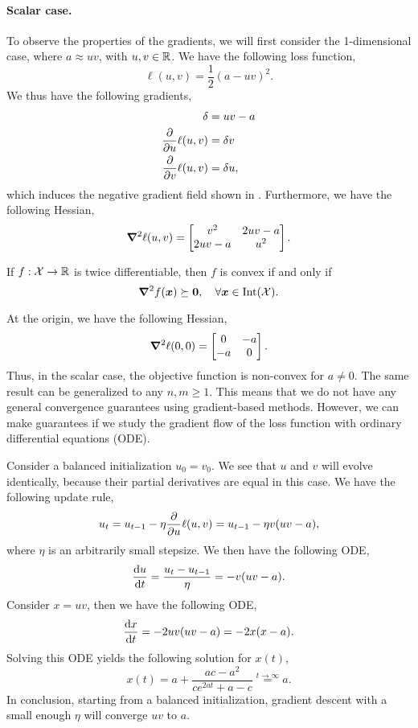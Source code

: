 \paragraph{Scalar case.}

To observe the properties of the gradients, we will first consider the 1-dimensional case, where $a
    \approx uv$, with $u,v\in\mathbb{R}$. We have the following loss function, \[
    \ell(u,v) = \frac{1}{2} (a - uv)^2.
\]
We thus have the following gradients,
\begin{align*}
    \delta              & = uv - a    \\
    \pdv*{\ell(u,v)}{u} & = \delta v  \\
    \pdv*{\ell(u,v)}{v} & = \delta u,
\end{align*}
which induces the negative gradient field shown in . Furthermore, we have the following Hessian, \[
    \bm{\nabla}^2_{\! } \ell(u,v) = \begin{bmatrix}
        v^2     & 2uv - a \\
        2uv - a & u^2
    \end{bmatrix}.
\]

\begin{lemma}
    If $f: \mathcal{X} \to \mathbb{R}$ is twice differentiable, then $f$ is convex if and only if \[
        \bm{\nabla}^2_{\! } f(\bm{x}) \succeq \bm{0}, \quad \forall \bm{x} \in \mathrm{Int}(\mathcal{X}).
    \]
\end{lemma}

At the origin, we have the following Hessian, \[
    \bm{\nabla}^2_{\! } \ell(0,0) = \begin{bmatrix}
        0  & -a \\
        -a & 0
    \end{bmatrix}.
\]
Thus, in the scalar case, the objective function is non-convex for $a \neq 0$. The same result can
be generalized to any $n,m \geq 1$. This means that we do not have any general convergence
guarantees using gradient-based methods. However, we can make guarantees if we study the gradient
flow of the loss function with ordinary differential equations (ODE).

Consider a balanced initialization $u_0 = v_0$. We see that $u$ and $v$ will evolve identically,
because their partial derivatives are equal in this case. We have the following update rule, \[
    u_t = u_{t-1} - \eta \pdv*{\ell(u,v)}{u} = u_{t-1} - \eta v(uv - a),
\]
where $\eta$ is an arbitrarily small stepsize. We then have the following ODE, \[
    \odv{u}{t} = \frac{u_t - u_{t-1}}{\eta} = -v(uv - a).
\]
Consider $x = uv$, then we have the following ODE, \[
    \odv{x}{t} = -2uv(uv-a) = -2x(x-a).
\]
Solving this ODE yields the following solution for $x(t)$, \[
    x(t) = a + \frac{ac - a^2}{ce^{2at} + a - c} \overset{t\to\infty}{=} a.
\]
In conclusion, starting from a balanced initialization, gradient descent with a small enough $\eta$
will converge $uv$ to $a$.

